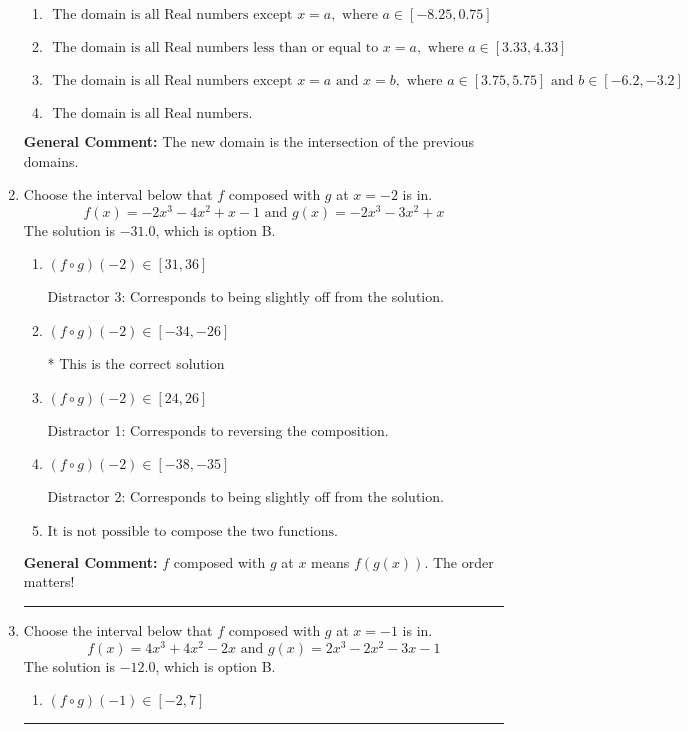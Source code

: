 \documentclass{extbook}[14pt]
\newcommand{\litem}[1]{\item #1

\rule{\textwidth}{0.4pt}}
\begin{document}
\begin{enumerate}
{\begin{enumerate}[label=\Alph*.]
\item \( \text{ The domain is all Real numbers except } x = a, \text{ where } a \in [-8.25, 0.75] \)


\item \( \text{ The domain is all Real numbers less than or equal to } x = a, \text{ where } a \in [3.33, 4.33] \)


\item \( \text{ The domain is all Real numbers except } x = a \text{ and } x = b, \text{ where } a \in [3.75, 5.75] \text{ and } b \in [-6.2, -3.2] \)


\item \( \text{ The domain is all Real numbers. } \)


\end{enumerate}

\textbf{General Comment:} The new domain is the intersection of the previous domains.
}
\litem{
Choose the interval below that $f$ composed with $g$ at $x=-2$ is in.
\[ f(x) = -2x^{3} -4 x^{2} +x -1 \text{ and } g(x) = -2x^{3} -3 x^{2} +x \]The solution is \( -31.0 \), which is option B.\begin{enumerate}[label=\Alph*.]
\item \( (f \circ g)(-2) \in [31, 36] \)

 Distractor 3: Corresponds to being slightly off from the solution.
\item \( (f \circ g)(-2) \in [-34, -26] \)

* This is the correct solution
\item \( (f \circ g)(-2) \in [24, 26] \)

 Distractor 1: Corresponds to reversing the composition.
\item \( (f \circ g)(-2) \in [-38, -35] \)

 Distractor 2: Corresponds to being slightly off from the solution.
\item \( \text{It is not possible to compose the two functions.} \)


\end{enumerate}

\textbf{General Comment:} $f$ composed with $g$ at $x$ means $f(g(x))$. The order matters!
}
\litem{
Choose the interval below that $f$ composed with $g$ at $x=-1$ is in.
\[ f(x) = 4x^{3} +4 x^{2} -2 x \text{ and } g(x) = 2x^{3} -2 x^{2} -3 x -1 \]The solution is \( -12.0 \), which is option B.\begin{enumerate}[label=\Alph*.]
\item \( (f \circ g)(-1) \in [-2, 7] \)


\end{enumerate}}
\end{enumerate}
\end{document}
